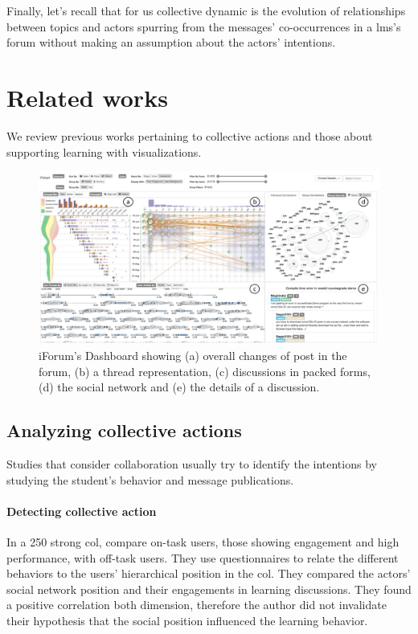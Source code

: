\documentclass[a4paper,twoside]{article}
\begin{document}

Finally, let's recall that for us collective dynamic is the evolution of relationships between topics and actors spurring from the messages' co-occurrences in a \gls{lms}'s forum without making an assumption about the actors' intentions.

\section{Related works}
\label{section:3}
We review previous works pertaining to collective actions and those about supporting learning with visualizations.


\begin{figure}[b]
 \small{
  \caption{\label{fig:fu}
   iForum's Dashboard \citep{Fu2017} showing (a) overall changes of post in the forum, (b) a thread representation, (c) discussions in packed forms, (d) the social network and (e) the details of a discussion.
  }}
 \centering
 \includegraphics[width=.5\textwidth]{images/fu.png}
\end{figure}


\subsection{Analyzing collective actions}
Studies that consider collaboration usually try to identify the intentions by studying the student's behavior and message publications.


\paragraph{Detecting collective action} In a 250 strong \gls{col}, \cite{Rehm2015} compare on-task users, those showing engagement and high performance, with off-task users.  They use questionnaires to relate the different behaviors to the users' hierarchical position in the \gls{col}.  They compared the actors' social network position and their engagements in learning discussions.  They found a positive correlation both dimension, therefore the author did not invalidate their hypothesis that the social position influenced the learning behavior.  %
\end{document}
